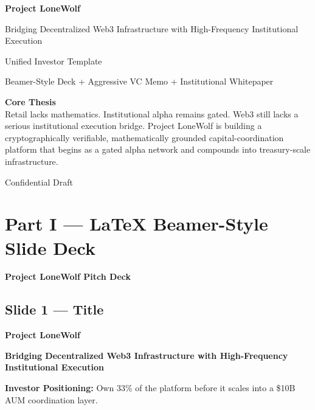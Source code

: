 \documentclass[11pt]{article}
\newcommand{\decktitle}[1]{
  \vspace{0.5em}
  {\Large\bfseries\color{wolfred} #1}
  \vspace{0.5em}
}
\begin{document}
\begin{titlepage}
\pagecolor{wolfblack}
\color{wolfwhite}
\centering
\vspace*{2cm}

{\Huge\bfseries Project LoneWolf\par}
\vspace{0.7em}
{\Large Bridging Decentralized Web3 Infrastructure with High-Frequency Institutional Execution\par}

\vspace{1.8em}
{\large Unified Investor Template\par}
\vspace{0.4em}
{\normalsize Beamer-Style Deck + Aggressive VC Memo + Institutional Whitepaper\par}

\vspace{2em}
\begin{tcolorbox}[colback=wolfblack,colframe=wolfgold,coltext=wolfwhite,boxrule=1pt,width=0.86\textwidth,arc=2mm]
\textbf{Core Thesis}\\
Retail lacks mathematics. Institutional alpha remains gated. Web3 still lacks a serious institutional execution bridge. Project LoneWolf is building a cryptographically verifiable, mathematically grounded capital-coordination platform that begins as a gated alpha network and compounds into treasury-scale infrastructure.
\end{tcolorbox}

\vfill
{\small Confidential Draft}
\end{titlepage}
\nopagecolor
\color{black}

\tableofcontents
\newpage

\section*{Part I --- LaTeX Beamer-Style Slide Deck}

\begin{center}
{\LARGE\bfseries Project LoneWolf Pitch Deck}
\end{center}

\subsection*{Slide 1 --- Title}
\begin{slidebox}
\decktitle{Project LoneWolf}
\textbf{Bridging Decentralized Web3 Infrastructure with High-Frequency Institutional Execution}

\vspace{0.5em}
\textbf{Investor Positioning:} Own 33\% of the platform before it scales into a \$10B AUM coordination layer.
\end{slidebox}
\end{document}
